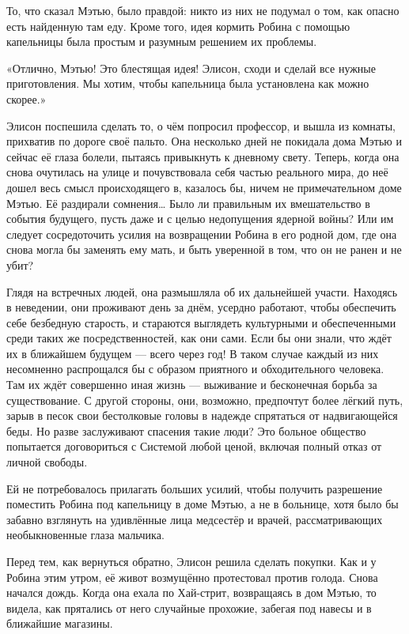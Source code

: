 \documentclass[a4paper,12pt]{book}
\begin{document}
\par
То, что сказал Мэтью, было правдой: никто из них не подумал о том, как опасно есть найденную там еду. Кроме того, идея кормить Робина с помощью капельницы была простым и разумным решением их проблемы.
\par
«Отлично, Мэтью! Это блестящая идея! Элисон, сходи и сделай все нужные приготовления. Мы хотим, чтобы капельница была установлена как можно скорее.»\\
\par
Элисон поспешила сделать то, о чём попросил профессор, и вышла из комнаты, прихватив по дороге своё пальто. Она несколько дней не покидала дома Мэтью и сейчас её глаза болели, пытаясь привыкнуть к дневному свету. Теперь, когда она снова очутилась на улице и почувствовала себя частью реального мира, до неё дошел весь смысл происходящего в, казалось бы, ничем не примечательном доме Мэтью. Её раздирали сомнения… Было ли правильным их вмешательство в события будущего, пусть даже и с целью недопущения ядерной войны? Или им следует сосредоточить усилия на возвращении Робина в его родной дом, где она снова могла бы заменять ему мать, и быть уверенной в том, что он не ранен и не убит?
\par
Глядя на встречных людей, она размышляла об их дальнейшей участи. Находясь в неведении, они проживают день за днём, усердно работают, чтобы обеспечить себе безбедную старость, и стараются выглядеть культурными и обеспеченными среди таких же посредственностей, как они сами. Если бы они знали, что ждёт их в ближайшем будущем — всего через год! В таком случае каждый из них несомненно распрощался бы с образом приятного и обходительного человека. Там их ждёт совершенно иная жизнь — выживание и бесконечная борьба за существование. С другой стороны, они, возможно, предпочтут более лёгкий путь, зарыв в песок свои бестолковые головы в надежде спрятаться от надвигающейся беды. Но разве заслуживают спасения такие люди? Это больное общество попытается договориться с Системой любой ценой, включая полный отказ от личной свободы.\\
\par
Ей не потребовалось прилагать больших усилий, чтобы получить разрешение поместить Робина под капельницу в доме Мэтью, а не в больнице, хотя было бы забавно взглянуть на удивлённые лица медсестёр и врачей, рассматривающих необыкновенные глаза мальчика.
\par
Перед тем, как вернуться обратно, Элисон решила сделать покупки. Как и у Робина этим утром, её живот возмущённо протестовал против голода. Снова начался дождь. Когда она ехала по Хай-стрит, возвращаясь в дом Мэтью, то видела, как прятались от него случайные прохожие, забегая под навесы и в ближайшие магазины.
\end{document}

